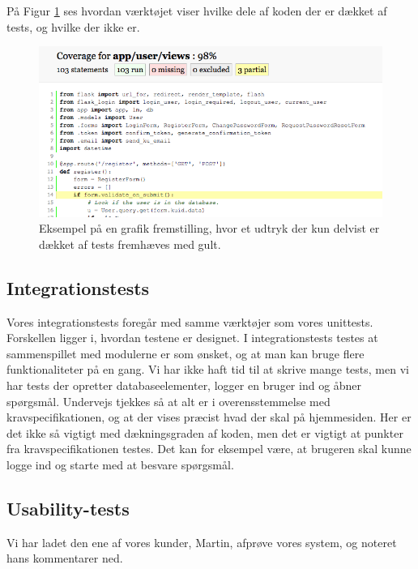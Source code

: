 \documentclass[11pt, a4paper]{article}
\begin{document}
På Figur \ref{fig:code_coverage} ses hvordan værktøjet viser hvilke dele af koden der er dækket af tests, og hvilke der ikke er.

\begin{figure}[h]
    \centering
    \includegraphics[width=1\linewidth]{figures/code_coverage.png}
    \caption{Eksempel på en grafik fremstilling, hvor et udtryk der kun delvist er dækket af tests fremhæves med gult.}
    \label{fig:code_coverage}
\end{figure}

\FloatBarrier

\subsection{Integrationstests}
\label{sub:integrationstests}
Vores integrationstests foregår med samme værktøjer som vores unittests. Forskellen ligger i, hvordan testene er designet. I integrationstests testes at sammenspillet med modulerne er som ønsket, og at man kan bruge flere funktionaliteter på en gang. Vi har ikke haft tid til at skrive mange tests, men vi har tests der opretter databaseelementer, logger en bruger ind og åbner spørgsmål. Undervejs tjekkes så at alt er i overensstemmelse med kravspecifikationen, og at der vises præcist hvad der skal på hjemmesiden. Her er det ikke så vigtigt med dækningsgraden af koden, men det er vigtigt at punkter fra kravspecifikationen testes. Det kan for eksempel være, at brugeren skal kunne logge ind og starte med at besvare spørgsmål.

\subsection{Usability-tests}
\label{sub:usability_tests}
Vi har ladet den ene af vores kunder, Martin, afprøve vores system, og noteret hans kommentarer ned.
\end{document}
